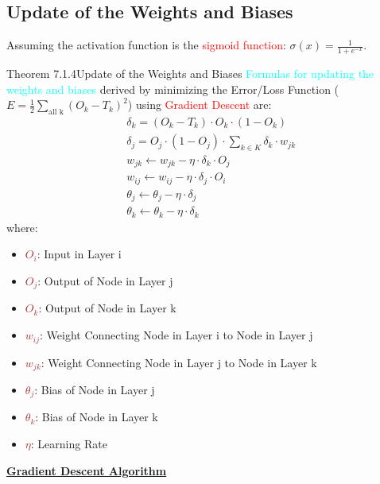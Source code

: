 \documentclass{book}
\begin{document}
\subsection{Update of the Weights and Biases}
Assuming the activation function is the \textcolor{red}{sigmoid function}: \(\sigma(x) = \frac{1}{1 + e^{-x}}\).\\
\begin{thmBox}{Theorem 7.1.4}{Update of the Weights and Biases}
\textcolor{cyan}{Formulas for updating the weights and biases} derived by minimizing the Error/Loss Function (\(E=\frac{1}{2}\sum_{\text{all k}} (O_k - T_k)^2\)) using \textcolor{red}{Gradient Descent} are:
\begin{align*}
    & \delta_k = (O_k - T_k) \cdot O_k \cdot (1 - O_k)\\
    & \delta_j = O_j \cdot (1 - O_j) \cdot \sum_{k \in K} \delta_k \cdot w_{jk}\\
    & w_{jk} \leftarrow w_{jk} - \eta \cdot \delta_k \cdot O_j\\
    & w_{ij} \leftarrow w_{ij} - \eta \cdot \delta_j \cdot O_i\\
    & \theta_j \leftarrow \theta_j - \eta \cdot \delta_j\\
    & \theta_k \leftarrow \theta_k - \eta \cdot \delta_k
\end{align*}
where:
\begin{itemize}
    \item \textcolor{brown}{\(O_i\)}: Input in Layer i
    \item \textcolor{brown}{\(O_j\)}: Output of Node in Layer j
    \item \textcolor{brown}{\(O_k\)}: Output of Node in Layer k
    \item \textcolor{brown}{\(w_{ij}\)}: Weight Connecting Node in Layer i to Node in Layer j
    \item \textcolor{brown}{\(w_{jk}\)}: Weight Connecting Node in Layer j to Node in Layer k
    \item \textcolor{brown}{\(\theta_j\)}: Bias of Node in Layer j
    \item \textcolor{brown}{\(\theta_k\)}: Bias of Node in Layer k
    \item \textcolor{brown}{\(\eta\)}: Learning Rate
\end{itemize}
\end{thmBox}
\newpage
\underline{\large{\textbf{Gradient Descent Algorithm}}}
\end{document}
